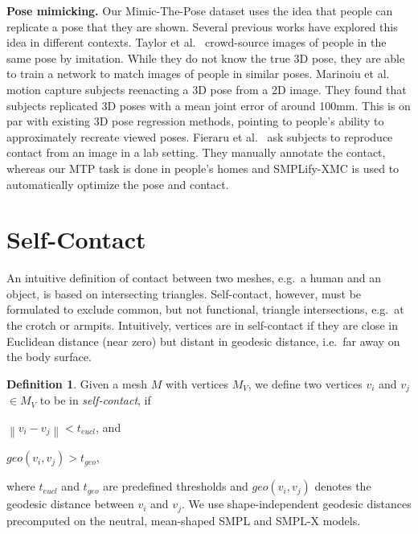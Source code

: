 \documentclass[final]{cvpr}
\newcommand{\geoth}{t_{\mathit{geo}}}
\newcommand{\euclth}{t_{\mathit{eucl}}}
\newcommand{\smplifyxmc}{\mbox{SMPLify-XMC}\xspace}
\theoremstyle{definition}
\newtheorem{definition}{Definition}[section]
\begin{document}
{\bf Pose mimicking.}
Our Mimic-The-Pose dataset uses the idea that people can replicate a pose that they are shown.
Several previous works have explored this idea in different contexts.
Taylor et al.~\cite{taylor2011learning} crowd-source images of people in the same pose by imitation.  
While they do not know the true 3D pose, they are able to train a network to match images of  people in similar poses.
Marinoiu et al.~\cite{marinoiu2013pictorial} motion capture subjects reenacting a 3D pose from a 2D image.
They found that subjects replicated 3D poses with a mean joint error of around 100mm.
This is on par with existing 3D pose regression methods, pointing to people's ability to approximately recreate viewed poses.
Fieraru et al.~\cite{Fieraru_2021_AAAI} 
ask subjects to reproduce contact from an image
in a lab setting.
They manually annotate the contact, whereas our MTP task is done in people's homes and \smplifyxmc is used to automatically optimize the pose and contact.

 	\section{Self-Contact}
\label{subsection:Contact}
An intuitive definition of contact between two meshes, e.g.~a human and an object, is based on intersecting triangles. Self-contact, however, must be formulated to exclude common, but not functional, triangle intersections, e.g.~at the crotch or armpits. 
Intuitively, vertices are in self-contact if they are close in Euclidean distance (near zero) but distant in geodesic distance, i.e.~far away on the body surface.
\begin{definition}
	\label{definition-selfcontact}
	Given a mesh $M$ with vertices $M_V$, we define two vertices $v_{i}$ and $v_{j}$ $\in M_V$ to be in \textit{self-contact}, if \begin{enumerate*}[label=(\roman*)] \item $\left\|  v_i - v_j \right\|  < \euclth$, and \item $\mathit{geo}(v_i, v_j) >\geoth$,\end{enumerate*} where $\euclth$ and $\geoth$ are predefined thresholds and $\mathit{geo}(v_i,v_j)$ denotes the geodesic distance between $v_i$ and $v_j$. We use shape-independent geodesic distances precomputed on the neutral, mean-shaped SMPL and SMPL-X models.  
\end{definition}
\end{document}
